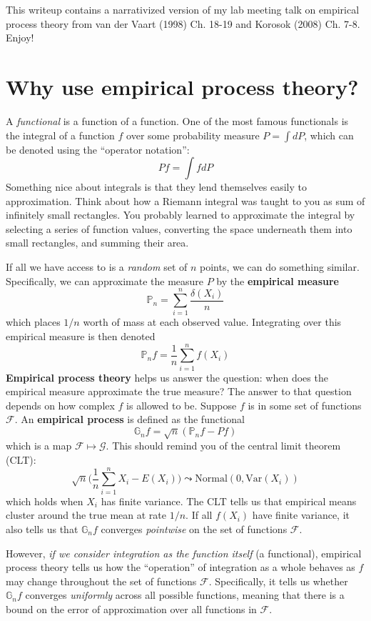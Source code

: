 \documentclass[
]{article}
\author{}
\date{}
\begin{document}
This writeup contains a narrativized version of my lab meeting talk on
empirical process theory from van der Vaart (1998) Ch. 18-19 and Korosok
(2008) Ch. 7-8. Enjoy! 

\section{Why use empirical process theory?}

A \emph{functional} is a function of a function. One of the most famous
functionals is the integral of a function \(f\) over some probability
measure \(P = \int dP\), which can be denoted using the ``operator
notation'':\[Pf = \int f dP\]Something nice about integrals is that they
lend themselves easily to approximation. Think about how a Riemann
integral was taught to you as sum of infinitely small rectangles. You
probably learned to approximate the integral by selecting a series of
function values, converting the space underneath them into small
rectangles, and summing their area.

If all we have access to is a \emph{random} set of \(n\) points, we can
do something similar. Specifically, we can approximate the measure \(P\)
by the \textbf{empirical measure}
\[\mathbb{P}_n = \sum_{i=1}^n \frac{\delta(X_i)}{n}\] which places
\(1/n\) worth of mass at each observed value. Integrating over this
empirical measure is then denoted
\[\mathbb{P}_nf = \frac{1}{n}\sum_{i=1}^n f(X_i)\] \textbf{Empirical
process theory} helps us answer the question: when does the empirical
measure approximate the true measure? The answer to that question
depends on how complex \(f\) is allowed to be. Suppose \(f\) is in some
set of functions \(\mathcal{F}\). An \textbf{empirical process} is
defined as the functional
\[\mathbb{G}_n f = \sqrt{n}(\mathbb{P}_nf - Pf)\] which is a map
\(\mathcal{F} \mapsto \mathcal{G}\). This should remind you of the
central limit theorem (CLT):
\[\sqrt{n}\Big(\frac{1}{n}\sum_{i=1}^nX_i - E(X_i)\Big) \leadsto \text{Normal}(0, \text{Var}(X_i))\]
which holds when \(X_i\) has finite variance. The CLT tells us that
empirical means cluster around the true mean at rate \(1/n\). If all
\(f(X_i)\) have finite variance, it also tells us that \(\mathbb{G}_nf\)
converges \emph{pointwise} on the set of functions \(\mathcal{F}\).

However, \emph{if we consider integration as the function itself} (a
functional), empirical process theory tells us how the ``operation'' of
integration as a whole behaves as \(f\) may change throughout the set of
functions \(\mathcal{F}\). Specifically, it tells us whether
\(\mathbb{G}_n f\) converges \emph{uniformly} across all possible
functions, meaning that there is a bound on the error of approximation
over all functions in \(\mathcal{F}\).
\end{document}
